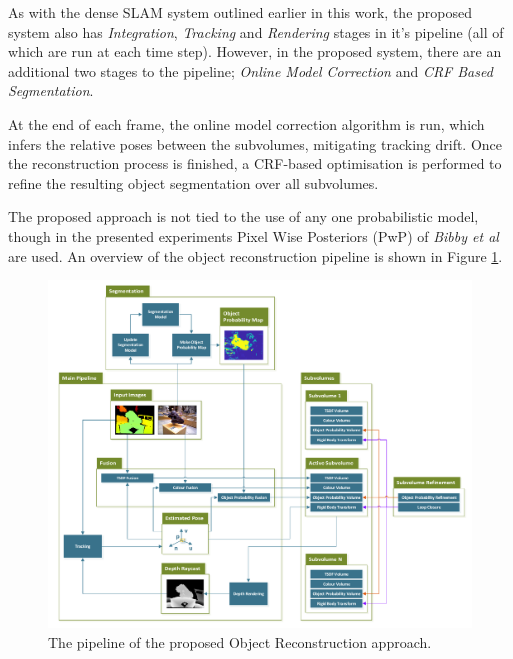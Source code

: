 As with the dense SLAM system outlined earlier in this work, the proposed system
also has \textit{Integration}, \textit{Tracking} and \textit{Rendering}
stages in it's pipeline (all of which are run at each time step). However, in
the proposed system, there are an additional two stages to the pipeline;
\textit{Online Model Correction} and \textit{CRF Based Segmentation}.

At the end of each frame, the online model correction algorithm is run, which
infers the relative poses between the subvolumes, mitigating tracking drift.
Once the reconstruction process is finished, a CRF-based optimisation is 
performed to refine the resulting object segmentation over all subvolumes.

The proposed approach is not tied to the use of any one probabilistic model,
though in the presented experiments Pixel Wise Posteriors (PwP) of \textit{Bibby et al} 
\cite{Bibby2008} are used. An overview of the object reconstruction pipeline is shown in
Figure \ref{fig:probobj_pipeline_diagram}.

\begin{figure}[h]
  \label{fig:probobj_pipeline_diagram}
  \centering
  \includegraphics[width=\linewidth]{figures/object_recon/pipeline.pdf}
  \caption[Probabilistic Object Reconstruction Pipeline]
  {The pipeline of the proposed Object Reconstruction approach.}
\end{figure}

